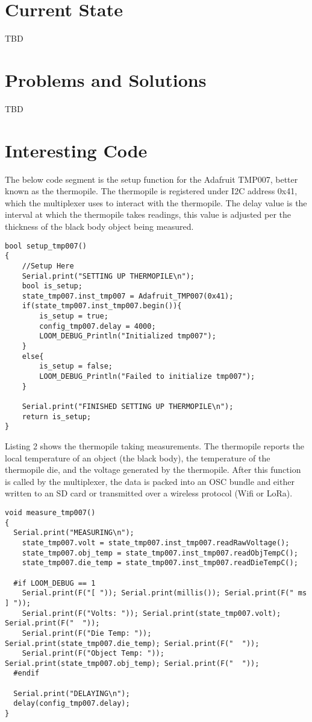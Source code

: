 \documentclass[10pt,draftclsnofoot,onecolumn,letterpaper]{article}
\begin{document}
\section{Current State}
TBD

\section{Problems and Solutions}
TBD

\section{Interesting Code}
The below code segment is the setup function for the Adafruit TMP007, better known as the thermopile. The thermopile is registered under I2C address 0x41, which the multiplexer uses to interact with the thermopile. The delay value is the interval at which the thermopile takes readings, this value is adjusted per the thickness of the black body object being measured.
\begin{lstlisting}[caption={TMP007 Setup},captionpos=b]
bool setup_tmp007() 
{
    //Setup Here
    Serial.print("SETTING UP THERMOPILE\n");
	bool is_setup;
	state_tmp007.inst_tmp007 = Adafruit_TMP007(0x41);
	if(state_tmp007.inst_tmp007.begin()){
		is_setup = true;
		config_tmp007.delay = 4000;
		LOOM_DEBUG_Println("Initialized tmp007");
	}
	else{
		is_setup = false;
		LOOM_DEBUG_Println("Failed to initialize tmp007");
	}

    Serial.print("FINISHED SETTING UP THERMOPILE\n");
    return is_setup;
}
\end{lstlisting}

Listing 2 shows the thermopile taking measurements. The thermopile reports the local temperature of an object (the black body), the temperature of the thermopile die, and the voltage generated by the thermopile. After this function is called by the multiplexer, the data is packed into an OSC bundle and either written to an SD card or transmitted over a wireless protocol (Wifi or LoRa). 

\begin{lstlisting}[caption={TMP007 Setup},captionpos=b]
void measure_tmp007() 
{
  Serial.print("MEASURING\n");
	state_tmp007.volt = state_tmp007.inst_tmp007.readRawVoltage();
	state_tmp007.obj_temp = state_tmp007.inst_tmp007.readObjTempC();
	state_tmp007.die_temp = state_tmp007.inst_tmp007.readDieTempC();

  #if LOOM_DEBUG == 1
    Serial.print(F("[ ")); Serial.print(millis()); Serial.print(F(" ms ] "));
    Serial.print(F("Volts: ")); Serial.print(state_tmp007.volt); Serial.print(F("  "));
    Serial.print(F("Die Temp: ")); Serial.print(state_tmp007.die_temp); Serial.print(F("  "));
    Serial.print(F("Object Temp: ")); Serial.print(state_tmp007.obj_temp); Serial.print(F("  "));
  #endif

  Serial.print("DELAYING\n");
  delay(config_tmp007.delay);
}
\end{lstlisting}
\end{document}
